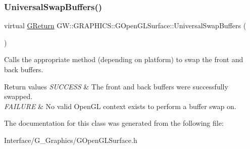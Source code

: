 \subsubsection{\texorpdfstring{Universal\+Swap\+Buffers()}{UniversalSwapBuffers()}}
{\footnotesize\ttfamily virtual \hyperlink{namespaceGW_a67a839e3df7ea8a5c5686613a7a3de21}{G\+Return} G\+W\+::\+G\+R\+A\+P\+H\+I\+C\+S\+::\+G\+Open\+G\+L\+Surface\+::\+Universal\+Swap\+Buffers (\begin{DoxyParamCaption}{ }\end{DoxyParamCaption})\hspace{0.3cm}{\ttfamily [pure virtual]}}



Calls the appropriate method (depending on platform) to swap the front and back buffers. 


\begin{DoxyRetVals}{Return values}
{\em S\+U\+C\+C\+E\+SS} & The front and back buffers were successfully swapped. \\
\hline
{\em F\+A\+I\+L\+U\+RE} & No valid Open\+GL context exists to perform a buffer swap on. \\
\hline
\end{DoxyRetVals}


The documentation for this class was generated from the following file\+:\begin{DoxyCompactItemize}
\item 
Interface/\+G\+\_\+\+Graphics/G\+Open\+G\+L\+Surface.\+h\end{DoxyCompactItemize}
